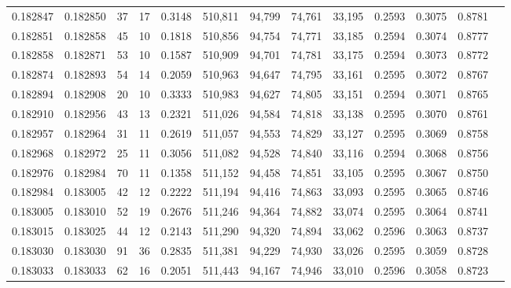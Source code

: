 \begin{tabular}{rrrrrrrrrrrrr}
0.182847 & 0.182850 &    37 &  17 &                                     0.3148 & 510,811 &  94,799 &  74,761 &  33,195 & 0.2593 & 0.3075 & 0.8781 \\
0.182851 & 0.182858 &    45 &  10 &                                     0.1818 & 510,856 &  94,754 &  74,771 &  33,185 & 0.2594 & 0.3074 & 0.8777 \\
0.182858 & 0.182871 &    53 &  10 &                                     0.1587 & 510,909 &  94,701 &  74,781 &  33,175 & 0.2594 & 0.3073 & 0.8772 \\
0.182874 & 0.182893 &    54 &  14 &                                     0.2059 & 510,963 &  94,647 &  74,795 &  33,161 & 0.2595 & 0.3072 & 0.8767 \\
0.182894 & 0.182908 &    20 &  10 &                                     0.3333 & 510,983 &  94,627 &  74,805 &  33,151 & 0.2594 & 0.3071 & 0.8765 \\
0.182910 & 0.182956 &    43 &  13 &                                     0.2321 & 511,026 &  94,584 &  74,818 &  33,138 & 0.2595 & 0.3070 & 0.8761 \\
0.182957 & 0.182964 &    31 &  11 &                                     0.2619 & 511,057 &  94,553 &  74,829 &  33,127 & 0.2595 & 0.3069 & 0.8758 \\
0.182968 & 0.182972 &    25 &  11 &                                     0.3056 & 511,082 &  94,528 &  74,840 &  33,116 & 0.2594 & 0.3068 & 0.8756 \\
0.182976 & 0.182984 &    70 &  11 &                                     0.1358 & 511,152 &  94,458 &  74,851 &  33,105 & 0.2595 & 0.3067 & 0.8750 \\
0.182984 & 0.183005 &    42 &  12 &                                     0.2222 & 511,194 &  94,416 &  74,863 &  33,093 & 0.2595 & 0.3065 & 0.8746 \\
0.183005 & 0.183010 &    52 &  19 &                                     0.2676 & 511,246 &  94,364 &  74,882 &  33,074 & 0.2595 & 0.3064 & 0.8741 \\
0.183015 & 0.183025 &    44 &  12 &                                     0.2143 & 511,290 &  94,320 &  74,894 &  33,062 & 0.2596 & 0.3063 & 0.8737 \\
0.183030 & 0.183030 &    91 &  36 &                                     0.2835 & 511,381 &  94,229 &  74,930 &  33,026 & 0.2595 & 0.3059 & 0.8728 \\
0.183033 & 0.183033 &    62 &  16 &                                     0.2051 & 511,443 &  94,167 &  74,946 &  33,010 & 0.2596 & 0.3058 & 0.8723 \\

\end{tabular}
